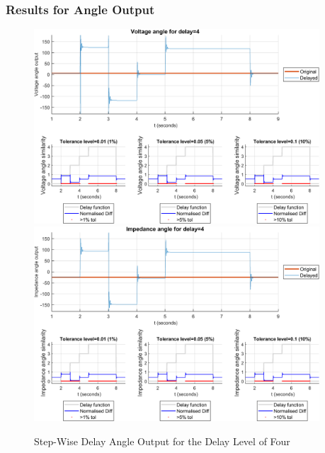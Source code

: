 \subsubsection{Results for Angle Output}


\begin{figure}
    \caption{Step-Wise Delay Angle Output for the Delay Level of Four}
    \includegraphics[width=0.95\textwidth]{PMUsim-figures/DelayOf_4/Step_vAngle.png}    
    \includegraphics[width=0.95\textwidth]{PMUsim-figures/DelayOf_4/Step_iAngle.png}    
    \label{fig:PMUsimStep_Four_Angle}
        \begin{small}
     \end{small}
\end{figure}

